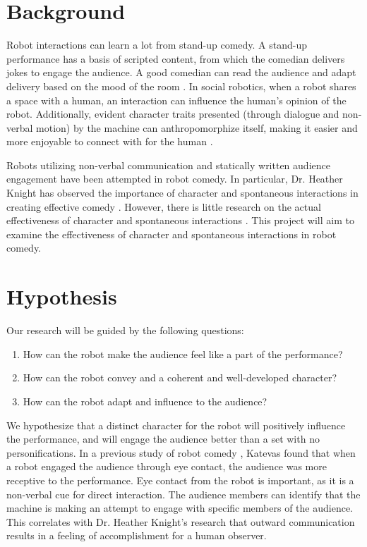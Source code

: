\documentclass[onecolumn, draftclsnofoot,10pt, compsoc]{IEEEtran}
\begin{document}
\section{Background}
Robot interactions can learn a lot from stand-up comedy. A stand-up performance has a basis of scripted content, from which the comedian delivers jokes to engage the audience. A good comedian can read the audience and adapt delivery based on the mood of the room \cite{talkingFunny}. In social robotics, when a robot shares a space with a human, an interaction can influence the human's opinion of the robot. Additionally, evident character traits presented (through dialogue and non-verbal motion) by the machine can anthropomorphize itself, making it easier and more enjoyable to connect with for the human \cite{KnightEightLessons:2011}.

Robots utilizing non-verbal communication and statically written audience engagement have been attempted in robot comedy. In particular, Dr. Heather Knight has observed the importance of character and spontaneous interactions in creating effective comedy \cite{KnightEightLessons:2011}. However, there is little research on the actual effectiveness of character and spontaneous interactions \cite{KatevasRobot:2014}. This project will aim to examine the effectiveness of character and spontaneous interactions in robot comedy.


\section{Hypothesis}

Our research will be guided by the following questions:
\begin{enumerate}[\IEEEsetlabelwidth{6)}]
\item How can the robot make the audience feel like a part of the performance?
\item How can the robot convey and a coherent and well-developed character?
\item How can the robot adapt and influence to the audience?
\end{enumerate}

We hypothesize that a distinct character for the robot will positively influence the performance, and will engage the audience better than a set with no personifications. In a previous study of robot comedy \cite{RobotComedyLab:2015}, Katevas found that when a robot engaged the audience through eye contact, the audience was more receptive to the performance. Eye contact from the robot is important, as it is a non-verbal cue for direct interaction. The audience members can identify that the machine is making an attempt to engage with specific members of the audience. This correlates with Dr. Heather Knight's \cite{KnightEightLessons:2011} research that outward communication results in a feeling of accomplishment for a human observer.
\end{document}
